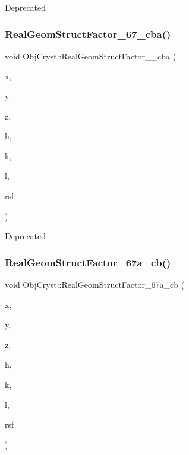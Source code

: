 \begin{DoxyRefDesc}{Deprecated}
\item[\mbox{\hyperlink{deprecated__deprecated000006}{Deprecated}}]\end{DoxyRefDesc}
\mbox{\label{namespace_obj_cryst_a7a4f122c474f2e0c78797deeb453a7c2}} 
\subsubsection{\texorpdfstring{RealGeomStructFactor\_67\_cba()}{RealGeomStructFactor\_67\_cba()}}
{\footnotesize\ttfamily void Obj\+Cryst\+::\+Real\+Geom\+Struct\+Factor\+\_\+\_\+cba (\begin{DoxyParamCaption}\item[{const R\+E\+AL}]{x,  }\item[{const R\+E\+AL}]{y,  }\item[{const R\+E\+AL}]{z,  }\item[{const Cryst\+Vector\+\_\+\+R\+E\+AL \&}]{h,  }\item[{const Cryst\+Vector\+\_\+\+R\+E\+AL \&}]{k,  }\item[{const Cryst\+Vector\+\_\+\+R\+E\+AL \&}]{l,  }\item[{Cryst\+Vector\+\_\+\+R\+E\+AL \&}]{rsf }\end{DoxyParamCaption})}

\begin{DoxyRefDesc}{Deprecated}
\item[\mbox{\hyperlink{deprecated__deprecated000009}{Deprecated}}]\end{DoxyRefDesc}
\mbox{\label{namespace_obj_cryst_a07e46df75b4fd4d12e5daf4519abf4ae}} 
\subsubsection{\texorpdfstring{RealGeomStructFactor\_67a\_cb()}{RealGeomStructFactor\_67a\_cb()}}
{\footnotesize\ttfamily void Obj\+Cryst\+::\+Real\+Geom\+Struct\+Factor\+\_\+67a\+\_\+cb (\begin{DoxyParamCaption}\item[{const R\+E\+AL}]{x,  }\item[{const R\+E\+AL}]{y,  }\item[{const R\+E\+AL}]{z,  }\item[{const Cryst\+Vector\+\_\+\+R\+E\+AL \&}]{h,  }\item[{const Cryst\+Vector\+\_\+\+R\+E\+AL \&}]{k,  }\item[{const Cryst\+Vector\+\_\+\+R\+E\+AL \&}]{l,  }\item[{Cryst\+Vector\+\_\+\+R\+E\+AL \&}]{rsf }\end{DoxyParamCaption})}

